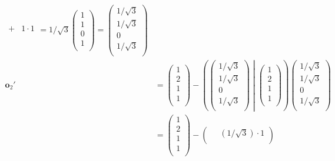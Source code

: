 \documentclass[dvipdfmx]{jsarticle}
\begin{document}
\begin{align*}
{{\begin{matrix}
   + & 1 \cdot 1 \\
\end{matrix}}} = {1}/{\sqrt{3}}\begin{pmatrix}
  1 \\
  1 \\
  0 \\
  1 \\
\end{pmatrix} = \begin{pmatrix}
  {1}/{\sqrt{3}} \\
  {1}/{\sqrt{3}} \\
  0 \\
  {1}/{\sqrt{3}} \\
\end{pmatrix}\\
\mathbf{o}_{2}' &= \begin{pmatrix}
  1 \\
  2 \\
  1 \\
  1 \\
\end{pmatrix} - \left( \begin{pmatrix}
  {1}/{\sqrt{3}} \\
  {1}/{\sqrt{3}} \\
  0 \\
  {1}/{\sqrt{3}} \\
\end{pmatrix} \middle| \begin{pmatrix}
  1 \\
  2 \\
  1 \\
  1 \\
\end{pmatrix} \right)\begin{pmatrix}
  {1}/{\sqrt{3}} \\
  {1}/{\sqrt{3}} \\
  0 \\
  {1}/{\sqrt{3}} \\
\end{pmatrix}\\
&= \begin{pmatrix}
  1 \\
  2 \\
  1 \\
  1 \\
\end{pmatrix} - \begin{pmatrix}
  \  & \left( {1}/{\sqrt{3}} \right) \cdot 1 \\

\end{pmatrix}
\end{align*}
\end{document}
